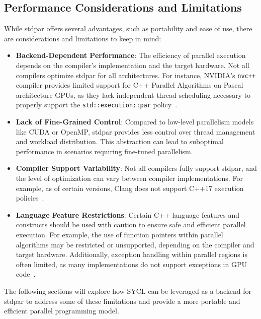 \subsection{Performance Considerations and Limitations}

While stdpar offers several advantages, such as portability and ease of use, there are considerations and
limitations to keep in mind:

\begin{itemize}
  \item \textbf{Backend-Dependent Performance}: The efficiency of parallel execution depends on the compiler's
  implementation and the target hardware. Not all compilers optimize stdpar for all architectures. For
  instance, NVIDIA's \texttt{nvc++} compiler provides limited support for C++ Parallel Algorithms on Pascal
  architecture GPUs, as they lack independent thread scheduling necessary to properly support the
  \texttt{std::execution::par} policy~\cite{NVIDIA2020}.
  \item \textbf{Lack of Fine-Grained Control}: Compared to low-level parallelism models like CUDA or OpenMP,
  stdpar provides less control over thread management and workload distribution. This abstraction can lead to
  suboptimal performance in scenarios requiring fine-tuned parallelism.
  \item \textbf{Compiler Support Variability}: Not all compilers fully support stdpar, and the level of
  optimization can vary between compiler implementations. For example, as of certain versions, Clang does not
  support C++17 execution policies~\cite{V'yukova2018}.
  \item \textbf{Language Feature Restrictions}: Certain C++ language features and constructs should be used
  with caution to ensure safe and efficient parallel execution. For example, the use of function pointers
  within parallel algorithms may be restricted or unsupported, depending on the compiler and target hardware.
  Additionally, exception handling within parallel regions is often limited, as many implementations do not
  support exceptions in GPU code~\cite{NVIDIA2020}.
\end{itemize}

The following sections will explore how SYCL can be leveraged as a backend for stdpar to address some of these
limitations and provide a more portable and efficient parallel programming model.
